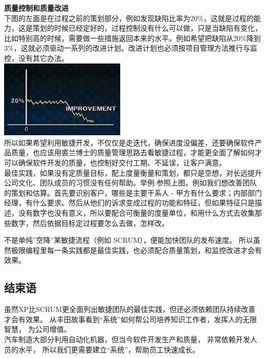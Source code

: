 \textbf{质量控制和质量改进}\\
下图的左面是在过程之前的策划部分，例如发现缺陷比率为20\%，这就是过程的能力，这是策划的时候已经定好的，过程控制没有什么可以做，只是当缺陷有变化，比如特别高的时候，需要做一些措施返回本来的水平。例如希望把缺陷从20\%降到3\%，这就必须驱动一系列的改进计划。改进计划也必须按项目管理方法推行与监控，没有其它办法。\\

\includegraphics[width=6cm]{JuranImprovementScreenshot_2022-10-23_211444.jpg}\\

所以如果希望利用敏捷开发，不仅仅是走迭代，确保进度没偏差，还要确保软件产品质量，也应该用裘兰博士的质量管理思路去看敏捷过程，才能更全面了解如何才可以确保软件开发的质量，也控制好交付工期、不延误，让客户满意。\\
最佳实践，如果没有定质量目标，配上度量衡量和策划，都只是空想，对长远提升公司文化、团队成员的习惯没有任何帮助。举例:参照上图，例如我们想改善团队的策划和估算。首先要识别客户，哪些是主要干系人
-
甲方有什么要求；内部部门经理，有什么要求。然后从他们的诉求变成过程的功能和特征，但如果特征只是描述，没有数字也没有意义，所以要配合可衡量的度量单位，和用什么方式去收集那些数字，然后依据目标定过程要怎么去做，怎样改。

不是单纯”空降”某敏捷流程（例如 SCRUM），便能加快团队的发布速度。
所以虽然极限编程里每一条实践都是最佳实践，也必须配合质量策划，和监控改进才会有效果。

\hypertarget{ux7ed3ux675fux8bed}{%
\subsection{结束语}\label{ux7ed3ux675fux8bed}}

虽然XP比SCRUM更全面列出敏捷团队的最佳实践，但还必须依赖团队持续改善才会有效果。
从丰田故事看到``系统''如何帮公司培养知识工作者，发挥人的无限智慧，
为公司增值。\\
汽车制造大部分利用自动化机器，但当今软件开发生产和质量，
非常依赖开发人员的水平， 所以我们更需要建立``系统''，帮助员工快速成长。

